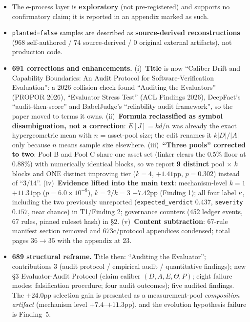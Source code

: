 \documentclass[11pt]{article}
\begin{document}
\begin{itemize}[leftmargin=1.4em]
  \item The e-process layer is \textbf{exploratory} (not pre-registered) and supports no confirmatory
        claim; it is reported in an appendix marked as such.
  \item \texttt{planted=false} samples are described as \textbf{source-derived reconstructions}
        (968 self-authored / 74 source-derived / 0 original external artifacts), not production code.
  \item \textbf{691 corrections and enhancements.} (i)~\textbf{Title} is now ``Caliber Drift and
        Capability Boundaries: An Audit Protocol for Software-Verification Evaluation'': a 2026
        collision check found ``Auditing the Evaluators'' (PROPOR 2026), ``Evaluator Stress Test''
        (ACL Findings 2026), DeepFact's ``audit-then-score'' and BabelJudge's ``reliability audit
        framework'', so the paper moved to terms it owns. (ii)~\textbf{Formula reclassified as
        symbol disambiguation, not a correction}: $E[J]=kd/n$ was already the exact hypergeometric
        mean with $n$ = asset-pool size; the edit renames it $k|D|/|A|$ only because $n$ means
        sample size elsewhere. (iii)~\textbf{``Three pools'' corrected to two}: Pool B and Pool C
        share one asset set (linker clears the 0.5\% floor at 0.88\%) with numerically identical
        blocks, so we report \textbf{9 distinct} pool$\,\times\,k$ blocks and ONE distinct
        improving tier ($k{=}4$, $+1.41$pp, $p{=}0.302$) instead of ``3/14''. (iv)~\textbf{Evidence
        lifted into the main text}: mechanism-level $k{=}1$ $+11.31$pp ($p{=}6.0\times10^{-8}$),
        $k{=}2/k{=}3$ $+7.42$pp (Finding 1); all four label $\kappa$, including the two previously
        unreported (\texttt{expected\_verdict} $0.437$, \texttt{severity} $0.157$, near chance) in
        T1/Finding 2; governance counters (452 ledger events, 67 rules, pinned ruleset hash) in
        \S2. (v)~\textbf{Content subtraction}: 67-rule manifest section removed and 673c/protocol
        appendices condensed; total pages $36\to35$ with the appendix at 23.
  \item \textbf{689 structural reframe.} Title then: ``Auditing the Evaluator''; contributions 3
        (audit protocol / empirical audit / quantitative findings); new \S3 Evaluator-Audit
        Protocol (claim caliber $(D,A,E,\Theta,P)$; eight failure modes; falsification procedure;
        four audit outcomes); five audited findings.
        The $+24.0$pp selection gain is presented as a measurement-pool \emph{composition artifact}
        (mechanism level $+7.4$--$+11.3$pp), and the evolution hypothesis failure is Finding~5.

\end{itemize}
\end{document}
